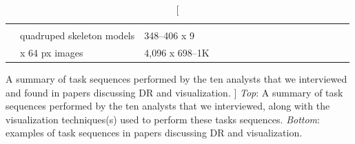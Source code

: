 \begin{table}
\begin{center}
\begin{tabular}{@{}|l|>{\RaggedRight}p{}l|*{2}c|*{5}c|*{7}c|@{}}
		&  \OK &  &  &  & 


		& \OK &  &  & \OK & & &


		\\

		\cite{Reveret2005} %


		& quadruped skeleton models & 348--406 x 9 %

		& \OK &

		& \OK & & & &


		& & & & \OK & & &

		\\

		\rowcolor{gray!15}

		\cite{Tenenbaum2000} %


		& 64 x 64 px images & 4,096 x 698--1K %

		& & \OK

		& \OK & & & &

		& \OK & & & \OK & & &

		\\







		\hline

	\end{tabular}
	\caption
	[
	    A summary of task sequences performed by the ten analysts that we interviewed and found in papers discussing \ac{DR} and visualization.
	]
	{
	    {\it Top}: A summary of task sequences performed by the ten analysts that we interviewed, along with the visualization techniques(s) used to perform these tasks sequences. 
	    {\it Bottom}: examples of task sequences in papers discussing \ac{DR} and visualization.
	} 
	\label{drvistasks:tab:summary}
	\end{center}
\end{table}

